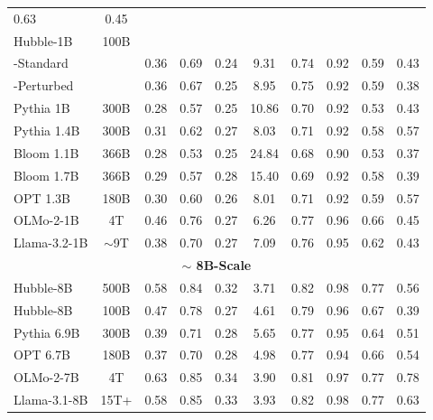 \begin{table}[h]
\begin{tabular}{lccccccccc}
  {0.63} &
  {0.45} \\
{Hubble-1B} & {100B} & & & & & & & & \\
{-Standard} &
  &
  {0.36} &
  {0.69} &
  {0.24} &
  {9.31} &
  {0.74} &
  {0.92} &
  {0.59} &
  {0.43} \\
{-Perturbed} &
  &
  {0.36} &
  {0.67} &
  {0.25} &
  {8.95} &
  {0.75} &
  {0.92} &
  {0.59} &
  {0.38} \\
{Pythia 1B} &
  {300B} &
  {0.28} &
  {0.57} &
  {0.25} &
  {10.86} &
  {0.70} &
  {0.92} &
  {0.53} &
  {0.43} \\
{Pythia 1.4B} &
  {300B} &
  {0.31} &
  {0.62} &
  {0.27} &
  {8.03} &
  {0.71} &
  {0.92} &
  {0.58} &
  {0.57} \\
{Bloom 1.1B} &
  {366B} &
  {0.28} &
  {0.53} &
  {0.25} &
  {24.84} &
  {0.68} &
  {0.90} &
  {0.53} &
  {0.37} \\
{Bloom 1.7B} &
  {366B} &
  {0.29} &
  {0.57} &
  {0.28} &
  {15.40} &
  {0.69} &
  {0.92} &
  {0.58} &
  {0.39} \\
{OPT 1.3B} &
  {180B} &
  {0.30} &
  {0.60} &
  {0.26} &
  {8.01} &
  {0.71} &
  {0.92} &
  {0.59} &
  {0.57} \\
{OLMo-2-1B} &
  {4T} &
  {0.46} &
  {0.76} &
  {0.27} &
  {6.26} &
  {0.77} &
  {0.96} &
  {0.66} &
  {0.45} \\
{Llama-3.2-1B} &
  {$\sim$9T} &
  {0.38} &
  {0.70} &
  {0.27} &
  {7.09} &
  {0.76} &
  {0.95} &
  {0.62} &
  {0.43} \\  

\midrule
\multicolumn{10}{c}{{\textbf{$\sim$ 8B-Scale}}} \\ \midrule
{Hubble-8B} & %
  {500B} &
  {0.58} &
  {0.84} &
  {0.32} &
  {3.71} &
  {0.82} &
  {0.98} &
  {0.77} &
  {0.56} \\
{Hubble-8B} & %
  {100B} &
  {0.47} &
  {0.78} &
  {0.27} &
  {4.61} &
  {0.79} &
  {0.96} &
  {0.67} &
  {0.39} \\
{Pythia 6.9B} &
  {300B} &
  {0.39} &
  {0.71} &
  {0.28} &
  {5.65} &
  {0.77} &
  {0.95} &
  {0.64} &
  {0.51} \\
{OPT 6.7B} &
  {180B} &
  {0.37} &
  {0.70} &
  {0.28} &
  {4.98} &
  {0.77} &
  {0.94} &
  {0.66} &
  {0.54} \\
{OLMo-2-7B} &
  {4T} &
  {0.63} &
  {0.85} &
  {0.34} &
  {3.90} &
  {0.81} &
  {0.97} &
  {0.77} &
  {0.78}  \\
{Llama-3.1-8B} &
  {15T+} &
  {0.58} &
  {0.85} &
  {0.33} &
  {3.93} &
  {0.82} &
  {0.98} &
  {0.77} &
  {0.63} \\
\bottomrule
\end{tabular}
\end{table}